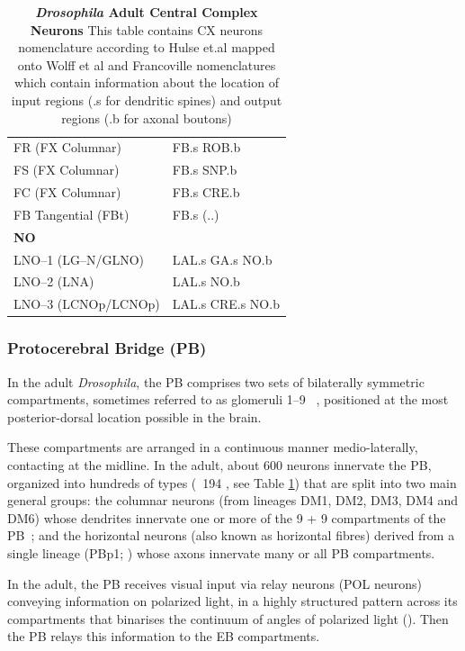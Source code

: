 \begin{table}[ht]
\begin{tabular}{l|l}
        FR (FX Columnar) & FB.s ROB.b \\
        FS (FX Columnar) & FB.s SNP.b \\
        FC (FX Columnar) & FB.s CRE.b \\
        FB Tangential (FBt) & FB.s (..) \\
        \midrule
        \multicolumn{2}{l}{\textbf{NO}} \\[2pt]
        LNO–1 (LG–N/GLNO) & LAL.s GA.s NO.b \\
        LNO–2 (LNA) & LAL.s NO.b \\
        LNO–3 (LCNOp/LCNOp) & LAL.s CRE.s NO.b \\
        \bottomrule
        \end{tabular}
        \caption[\textit{Drosophila} Adult Central Complex Neurons]{\textbf{\textit{Drosophila} Adult Central Complex Neurons} This table contains CX neurons nomenclature according to Hulse et.al \citep{hulse2021connectome} mapped onto Wolff et al\citep{wolff2018neuroarchitecture} and Francoville \citep{franconville2018building} nomenclatures which contain information about the location of input regions (.s for dendritic spines) and output regions (.b for axonal boutons)}
        \label{AdultCXneurons}
        \end{table}

        \subsubsection{Protocerebral Bridge (PB)}
        In the adult \textit{Drosophila}, the PB comprises two sets of bilaterally symmetric compartments, sometimes referred to as glomeruli 1–9 ~\cite{hulse2021connectome}, positioned at the most posterior-dorsal location possible in the brain.

        These compartments are arranged in a continuous manner medio-laterally, contacting at the midline. In the adult, about 600 neurons innervate the PB, organized into hundreds of types (~194 \citep{wolff2015neuroarchitecture}, see Table \ref{AdultCXneurons}) that are split into two main general groups: the columnar neurons (from lineages DM1, DM2, DM3, DM4 and DM6) whose dendrites innervate one or more of the 9 + 9 compartments of the PB~\citep{wolff2015neuroarchitecture}; and the horizontal neurons (also known as horizontal fibres) derived from a single lineage (PBp1; \citep{andrade2019developmentally}) whose axons innervate many or all PB compartments.

        In the adult, the PB receives visual input via relay neurons (POL neurons) conveying information on polarized light, in a highly structured pattern across its compartments that binarises the continuum of angles of polarized light (\citep{heinze2009transformation}). Then the PB relays this information to the EB compartments.

